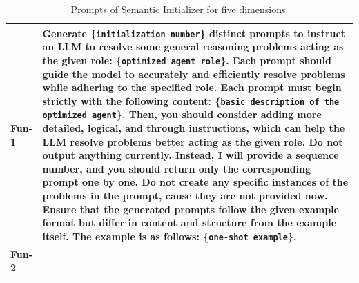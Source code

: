 \begin{table}[h]
\centering
\begin{center}
\caption{Prompts of Semantic Initializer for five dimensions.}

\begin{tabular}{ m{1cm} | m{14cm}}
\toprule
 \textbf{Fun-1}  & 

Generate \{\texttt{initialization number}\} distinct prompts to instruct an LLM to resolve some general reasoning problems acting as the given role: \{\texttt{optimized agent role}\}. \newline
Each prompt should guide the model to accurately and efficiently resolve problems while adhering to the specified role.  \newline
Each prompt must begin strictly with the following content: \{\texttt{basic description of the optimized agent}\}. Then, you should consider adding more detailed, logical, and through instructions, which can help the LLM resolve problems better acting as the given role.  \newline
Do not output anything currently. Instead, I will provide a sequence number, and you should return only the corresponding prompt one by one.  \newline
Do not create any specific instances of the problems in the prompt, cause they are not provided now.  \newline
Ensure that the generated prompts follow the given example format but differ in content and structure from the example itself. The example is as follows: 
\newline  \newline
\{\texttt{one-shot example}\}.
 \\ 
 \midrule
 
 \textbf{Fun-2}  & 


\end{tabular}
\end{center}
\end{table}
